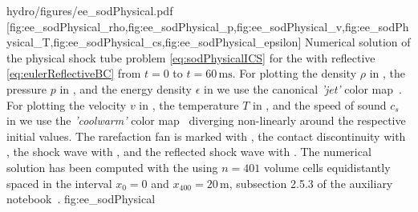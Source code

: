 \fullWidthFigure%
	{hydro/figures/ee_sodPhysical.pdf}%
	[fig:ee_sodPhysical_rho,fig:ee_sodPhysical_p,fig:ee_sodPhysical_v,fig:ee_sodPhysical_T,fig:ee_sodPhysical_cs,fig:ee_sodPhysical_epsilon]%
	{Numerical solution of the physical shock tube problem \eqref{eq:sodPhysicalICS} for the \eulereqs{} with reflective \bcs{} \eqref{eq:eulerReflectiveBC} from $t=0$ to $t=60\,\mathrm{ms}$.
	For plotting the density $\rho$ in , the pressure $p$ in , and the energy density $\epsilon$ in  we use the canonical \textit{'jet'} color map~\cite{Hunter:2007}.
	For plotting the velocity $v$ in , the temperature $T$ in , and the speed of sound $c_s$ in  we use the \textit{'coolwarm'} color map~\cite{Hunter:2007} diverging non-linearly around the respective initial values.
	The rarefaction fan is marked with , the contact discontinuity with , the shock wave with , and the reflected shock wave with .
	The numerical solution has been computed with the \ktScheme{} using $n=401$ volume cells equidistantly spaced in the interval $x_0=0$ and $x_{400}=20\,\mathrm{m}$, \cf{} subsection 2.5.3 of the auxiliary notebook~\cite{Steil:2023PhDFVNB}.
	}%
	{fig:ee_sodPhysical}%
\clearpage


